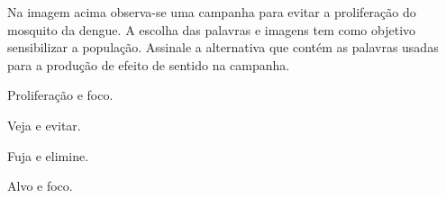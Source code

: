 
Na imagem acima observa-se uma campanha para evitar a proliferação do
mosquito da dengue. A escolha das palavras e imagens tem como objetivo
sensibilizar a população. Assinale a alternativa que contém as palavras
usadas para a produção de efeito de sentido na campanha. 

\begin{escolha}
  
  \item Proliferação e foco.
  
  \item Veja e evitar.
  
  \item Fuja e elimine.
  
  \item Alvo e foco. 

\end{escolha}

